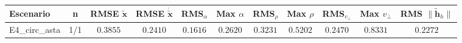 \begin{tabular}{lcccccccccc}
\toprule
Escenario & n & RMSE $\tilde{\mathbf{x}}$ & RMSE $\dot{\tilde{\mathbf{x}}}$ & RMS$_\alpha$ & Max $\alpha$ & RMS$_\rho$ & Max $\rho$ & RMS$_{v_\perp}$ & Max $v_\perp$ & RMS $\|\tilde{\mathbf{h}}_h\|$ \\
\midrule
E4\_circ\_asta & 1/1 & $0.3855$ & $0.2410$ & $0.1616$ & $0.2620$ & $0.3231$ & $0.5202$ & $0.2470$ & $0.8331$ & $0.2272$ \\
\bottomrule
\end{tabular}
